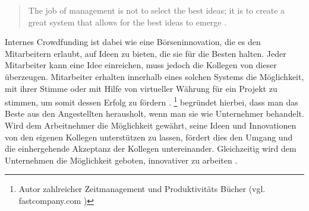 \begin{quote}
	\glqq The job of management is not to select the best ideas; it is to create a great system that allows for the best ideas to emerge \cite{appelo2014medium}.\grqq{}
\end{quote}

Internes Crowdfunding ist dabei wie eine Börseninnovation, die es den Mitarbeitern erlaubt, auf Ideen zu bieten, die sie für die Besten halten. Jeder Mitarbeiter kann eine Idee einreichen, muss jedoch die Kollegen von dieser überzeugen. Mitarbeiter erhalten innerhalb eines solchen Systems die Möglichkeit, mit ihrer Stimme oder mit Hilfe von virtueller Währung für ein Projekt zu stimmen, um somit dessen Erfolg zu fördern \cite{management3_internal_crowdfunding}. %
\citeauthor{vanderkam2014}\footnote{Autor zahlreicher Zeitmanagement und Produktivitäts Bücher (vgl. fastcompany.com \cite{vanderkam2014})} begründet hierbei, dass man das Beste aus den Angestellten herausholt, wenn man sie wie Unternehmer behandelt. Wird dem Arbeitnehmer die Möglichkeit gewährt, seine Ideen und Innovationen von den eigenen Kollegen unterstützen zu lassen, fördert dies den Umgang und die einhergehende Akzeptanz der Kollegen untereinander. Gleichzeitig wird dem Unternehmen die Möglichkeit geboten, innovativer zu arbeiten \cite{appelo2014medium}.





